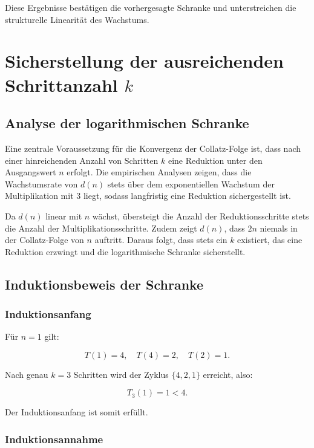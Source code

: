 \documentclass[a4paper,12pt]{article}
\begin{document}
Diese Ergebnisse bestätigen die vorhergesagte Schranke und unterstreichen die strukturelle Linearität des Wachstums.




\section{Sicherstellung der ausreichenden Schrittanzahl \( k \)}

\subsection{Analyse der logarithmischen Schranke}

Eine zentrale Voraussetzung für die Konvergenz der Collatz-Folge ist, dass nach einer hinreichenden Anzahl von Schritten \( k \) eine Reduktion unter den Ausgangswert \( n \) erfolgt. Die empirischen Analysen zeigen, dass die Wachstumsrate von \( d(n) \) stets über dem exponentiellen Wachstum der Multiplikation mit 3 liegt, sodass langfristig eine Reduktion sichergestellt ist.

Da \( d(n) \) linear mit \( n \) wächst, übersteigt die Anzahl der Reduktionsschritte stets die Anzahl der Multiplikationsschritte. Zudem zeigt \( d(n) \), dass \( 2n \) niemals in der Collatz-Folge von \( n \) auftritt. Daraus folgt, dass stets ein \( k \) existiert, das eine Reduktion erzwingt und die logarithmische Schranke sicherstellt.

\subsection{Induktionsbeweis der Schranke}

\subsubsection{Induktionsanfang}

Für \( n = 1 \) gilt:

\[
T(1) = 4, \quad T(4) = 2, \quad T(2) = 1.
\]

Nach genau \( k = 3 \) Schritten wird der Zyklus \( \{4, 2, 1\} \) erreicht, also:

\[
T_3(1) = 1 < 4.
\]

Der Induktionsanfang ist somit erfüllt.

\subsubsection{Induktionsannahme}
\end{document}
